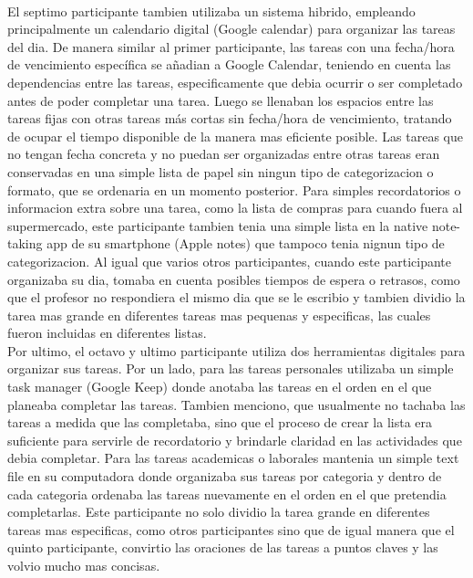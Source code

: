 \\
El septimo participante tambien utilizaba un sistema hibrido, empleando principalmente un calendario digital (Google calendar) para organizar las tareas del dia. De manera similar al primer participante, las tareas con una fecha/hora de vencimiento específica se añadian a Google Calendar, teniendo en cuenta las dependencias entre las tareas, especificamente que debia ocurrir o ser completado antes de poder completar una tarea. Luego se llenaban los espacios entre las tareas fijas con otras tareas más cortas sin fecha/hora de vencimiento, tratando de ocupar el tiempo disponible de la manera mas eficiente posible. Las tareas que no tengan fecha concreta y no puedan ser organizadas entre otras tareas eran conservadas en una simple lista de papel sin ningun tipo de categorizacion o formato, que se ordenaria en un momento posterior. Para simples recordatorios o informacion extra sobre una tarea, como la lista de compras para cuando fuera al supermercado, este participante tambien tenia una simple lista en la native note-taking app de su smartphone (Apple notes) que tampoco tenia nignun tipo de categorizacion. Al igual que varios otros participantes, cuando este participante organizaba su dia, tomaba en cuenta posibles tiempos de espera o retrasos, como que el profesor no respondiera el mismo dia que se le escribio y tambien dividio la tarea mas grande en diferentes tareas mas pequenas y especificas, las cuales fueron incluidas en diferentes listas. 
\\
Por ultimo, el octavo y ultimo participante utiliza dos herramientas digitales para organizar sus tareas. Por un lado, para las tareas personales utilizaba un simple task manager (Google Keep) donde anotaba las tareas en el orden en el que planeaba completar las tareas. Tambien menciono, que usualmente no tachaba las tareas a medida que las completaba, sino que el proceso de crear la lista era suficiente para servirle de recordatorio y brindarle claridad en las actividades que debia completar. Para las tareas academicas o laborales mantenia un simple text file en su computadora donde organizaba sus tareas por categoria y dentro de cada categoria ordenaba las tareas nuevamente en el orden en el que pretendia completarlas. Este participante no solo dividio la tarea grande en diferentes tareas mas especificas, como otros participantes sino que de igual manera que el  quinto participante, convirtio las oraciones de las tareas a puntos claves y las volvio mucho mas concisas. 
    


